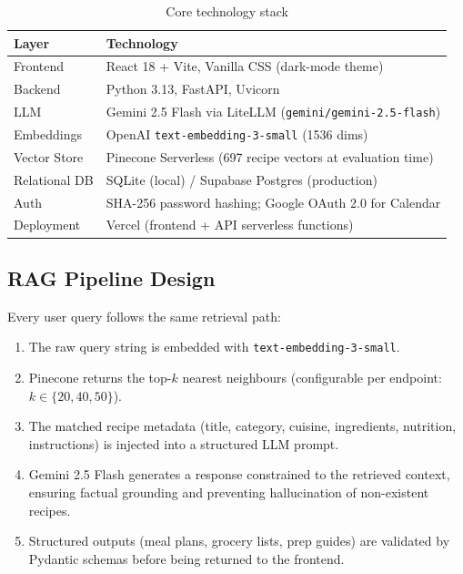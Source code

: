 \documentclass[12pt,letterpaper]{article}
\begin{document}
\begin{table}[h!]
  \centering
  \caption{Core technology stack}
  \label{tab:stack}
  \begin{tabularx}{\textwidth}{L{3.2cm} X}
    \toprule
    \textbf{Layer} & \textbf{Technology} \\
    \midrule
    Frontend      & React 18 + Vite, Vanilla CSS (dark-mode theme) \\
    Backend       & Python 3.13, FastAPI, Uvicorn \\
    LLM           & Gemini 2.5 Flash via LiteLLM (\texttt{gemini/gemini-2.5-flash}) \\
    Embeddings    & OpenAI \texttt{text-embedding-3-small} (1536 dims) \\
    Vector Store  & Pinecone Serverless (697 recipe vectors at evaluation time) \\
    Relational DB & SQLite (local) / Supabase Postgres (production) \\
    Auth          & SHA-256 password hashing; Google OAuth 2.0 for Calendar \\
    Deployment    & Vercel (frontend + API serverless functions) \\
    \bottomrule
  \end{tabularx}
\end{table}

\subsection{RAG Pipeline Design}

Every user query follows the same retrieval path:

\begin{enumerate}[itemsep=2pt]
  \item The raw query string is embedded with \texttt{text-embedding-3-small}.
  \item Pinecone returns the top-$k$ nearest neighbours (configurable per endpoint:
    $k \in \{20, 40, 50\}$).
  \item The matched recipe metadata (title, category, cuisine, ingredients, nutrition,
    instructions) is injected into a structured LLM prompt.
  \item Gemini 2.5 Flash generates a response constrained to the retrieved context,
    ensuring factual grounding and preventing hallucination of non-existent recipes.
  \item Structured outputs (meal plans, grocery lists, prep guides) are validated by
    Pydantic schemas before being returned to the frontend.
\end{enumerate}
\end{document}
